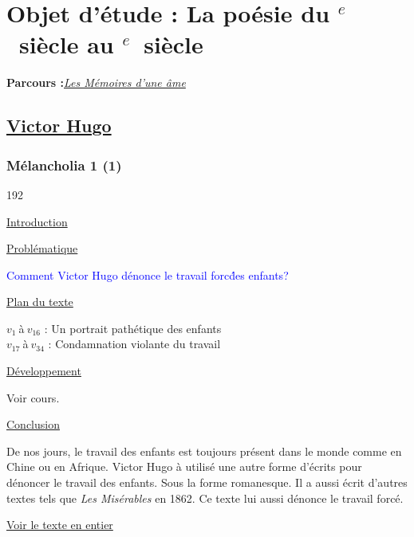 \documentclass[12pt,a4paper]{article}
\begin{document}
\begin{center}
\setcounter{tocdepth}{4}								%
\renewcommand{\contentsname}{Sommaire}					%
\tableofcontents										%
\end{center}
\newpage
		\section[Les M\'emoires d'une \^ame]{Objet d'\'etude : La po\'esie du \textsc{}$^{e}$~siècle au \textsc{}$^{e}$~siècle}
		\textbf{Parcours :}\textit{\underline{Les M\'emoires d'une \^ame}}
			\subsection{\href{Bio/Hugo.pdf}{Victor Hugo}}
				\subsubsection{M\'elancholia 1 (1) }
\begin{dingautolist}{192}

\item \underline{Introduction} \par


\item \underline{Probl\'ematique }\par
	\textcolor{blue}{Comment Victor Hugo d\'enonce le travail forc\' des enfants?}
\item \underline{Plan du texte} \par
		$v_{1}~$\`a$~v_{16}$ : Un portrait path\'etique des enfants\\
        $v_{17}~$\`a$~v_{34}$ : Condamnation violante du travail 
	

\item \underline{D\'eveloppement} \par
	Voir cours.

\item \underline{Conclusion} \par
	De nos jours, le travail des enfants est toujours pr\'esent dans le monde comme en Chine ou en Afrique. Victor Hugo \`a utilis\'e une autre forme d'\'ecrits pour d\'enoncer le travail des enfants. Sous la forme romanesque. Il a aussi \'ecrit d'autres textes tels que \textit{Les Mis\'erables} en 1862. Ce texte lui aussi d\'enonce le travail forc\'e.
\end{dingautolist}
\href{Textes/Melancholia.pdf}{Voir le texte en entier}
 \newpage
\end{document}
